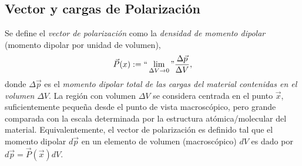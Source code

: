 \subsection{Vector y cargas de Polarización}

Se define el \textit{vector de polarización} como la \textit{densidad de
momento dipolar} (momento dipolar por unidad de volumen),
\begin{equation}\label{defP}
\vec{P}(x):= ``\lim_{\Delta V\to 0}" \frac{\Delta\vec{p}}{\Delta V},
\end{equation}
donde $\Delta\vec{p}$ es el \textit{momento dipolar total de las cargas del material contenidas en el volumen} $\Delta V$. La región con volumen $\Delta V$ se considera centrada en el punto $\vec{x}$, suficientemente peque\~na desde el punto de vista macroscópico, pero grande comparada con la escala  determinada por la estructura atómica/molecular del material. Equivalentemente, el vector de polarización es definido tal que el momento dipolar $d\vec{p}$ en un elemento de volumen (macroscópico) $dV$ es dado por $d\vec{p}=\vec{P}(\vec{x})dV$.

